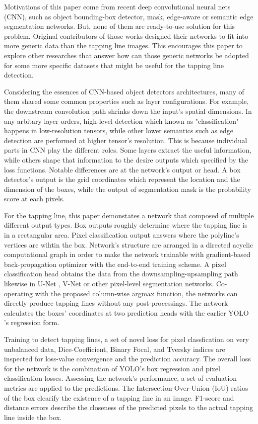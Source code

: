 \documentclass[default,pdflatex,iicol]{sn-jnl}%
\begin{document}
Motivations of this paper come from recent deep convolutional neural nets (CNN), such as object bounding-box detector, mask, edge-aware or semantic edge segmentation networks. But, none of them are ready-to-use solution for this problem. Original contributors of those works designed their networks to fit into more generic data than the tapping line images. This encourages this paper to explore other researches that answer how can those generic networks be adopted for some more specific datasets that might be useful for the tapping line detection.

Considering the essences of CNN-based object detectors architectures, many of them shared some common properties such as layer configurations. For example, the downstream convolution path shrinks down the input's spatial dimensions. In any arbitary layer orders, high-level detection which known as "classification" happens in low-resolution tensors, while other lower semantics such as edge detection are performed at higher tensor's resolution. This is because individual parts in CNN play the different roles. Some layers extract the useful information, while others shape that information to the desire outputs which specified by the loss functions. Notable differences are at the network's output or head. A box detector's output is the grid coordinates which represent the location and the dimension of the boxes, while the output of segmentation mask is the probability score at each pixels.

For the tapping line, this paper demonstates a network that composed of multiple different output types. Box outputs roughly determine where the tapping line is in a rectangular area. Pixel classification output answers where the polyline's vertices are wihtin the box. Network's structure are arranged in a directed acyclic computational graph in order to make the network trainable with gradient-based back-propagation optimizer with the end-to-end training scheme. A pixel classification head obtains the data from the downsampling-upsampling path likewise in U-Net \cite{unet}, V-Net \cite{vnet} or other pixel-level segmentation networks. Co-operating with the proposed column-wise argmax function, the networks can directly produce tapping lines without any post-processings. The network calculates the boxes' coordinates at two prediction heads with the earlier YOLO \cite{redmonyolov2} 's regression form.

Training to detect tapping lines, a set of novel loss for pixel classfication on very unbalanced data, Dice-Coefficient, Binary Focal, and Tversky indices are inspected for loss-value convergence and the prediction accuracy. The overall loss for the network is the combination of YOLO's box regression and pixel classification losses. Assessing the network's performance, a set of evaluation metrics are applied to the predictions. The Intersection-Over-Union (IoU) ratios of the box clearify the existence of a tapping line in an image. F1-score and distance errors describe the closeness of the predicted pixels to the actual tapping line inside the box.
\end{document}
